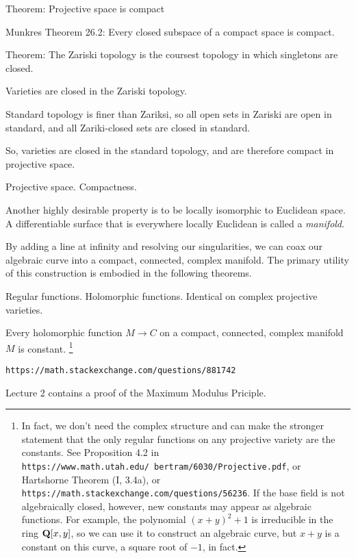 Theorem: Projective space is compact

Munkres Theorem 26.2: Every closed subspace of a compact space is compact.

Theorem: The Zariski topology is the coursest topology in which
singletons are closed.

Varieties are closed in the Zariski topology.

Standard topology is finer than Zariksi, so all open sets in Zariski
are open in standard, and all Zariki-closed sets are closed in standard.

So, varieties are closed in the standard topology, and are therefore
compact in projective space.



Projective space.  Compactness.

Another highly desirable property is to be locally isomorphic to
Euclidean space.  A differentiable surface that is everywhere locally
Euclidean is called a {\it manifold}.

By adding a line at infinity and resolving our singularities, we can
coax our algebraic curve into a compact, connected, complex manifold.
The primary utility of this construction is embodied in the following
theorems.

Regular functions.  Holomorphic functions.  Identical on complex
projective varieties.

\theorem
\label{holomorphic functions on compact manifolds are constant}

Every holomorphic function $M \to C$ on a compact, connected, complex manifold $M$ is constant.
\footnote{
In fact, we don't need the complex structure and can make the stronger
statement that the only regular functions on any projective variety are the constants.
See Proposition 4.2 in
{\tt https://www.math.utah.edu/~bertram/6030/Projective.pdf},
or Hartshorne Theorem (I, 3.4a),
or {\tt https://math.stackexchange.com/questions/56236}.
If the base field is not algebraically closed, however,
new constants may appear as algebraic functions.
For example, the polynomial $(x+y)^2+1$ is
irreducible in the ring $\mathbf{Q}[x,y]$, so we can use it to construct
an algebraic curve, but $x+y$ is a constant on this
curve, a square root of $-1$, in fact.
}

\proof

{\tt https://math.stackexchange.com/questions/881742}

\cite{guillemin} Lecture 2 contains a proof of the Maximum Modulus Priciple.

